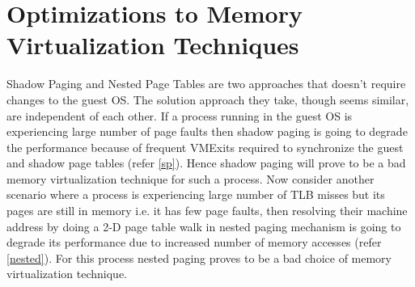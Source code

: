 \section{Optimizations to Memory Virtualization Techniques}
Shadow Paging and Nested Page Tables are two approaches that doesn't require changes to the guest
OS. The solution approach they take, though seems similar, are independent of each other. If a 
process running in the guest OS is experiencing large number of page faults then shadow paging is
going to degrade the performance because of frequent VMExits required to synchronize the guest and
shadow page tables (refer \ref{sp}). Hence shadow paging will prove to be a bad memory
virtualization technique for such a process. Now consider another scenario where a process is
experiencing large number of TLB misses but its pages are still in memory i.e. it has few page
faults, then resolving their machine address by doing a 2-D page table walk in nested paging
mechanism is going to degrade its performance due to increased number of memory accesses (refer
\ref{nested}). For this process nested paging proves to be a bad choice of memory virtualization
technique.
